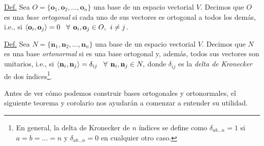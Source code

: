 \documentclass[12pt,dvipsnames]{article}
\begin{document}
\begin{tcolorbox}

    \underline{Def.} Sea $O=\{\mathbf{o}_1, \mathbf{o}_2, ..., \mathbf{o}_n\}$ una base de un espacio vectorial $V$. Decimos que $O$ es una \emph{base ortogonal} si cada uno de sus vectores es ortogonal a todos los demás, i.e., si $\langle\mathbf{o}_i,\mathbf{o}_j\rangle=0\hspace{3mm}\forall\hspace{1.5mm} \mathbf{o}_i, \mathbf{o}_j\in O, \hspace{1.5mm} i\neq j$.

\vspace{3mm}

    \underline{Def.} Sea $N=\{\mathbf{n}_1, \mathbf{n}_2, ..., \mathbf{n}_n\}$ una base de un espacio vectorial $V$. Decimos que $N$ es una base \emph{ortonormal} si es una base ortogonal y, además, todos sus vectores son unitarios, i.e., si $\langle\mathbf{n}_i,\mathbf{n}_j\rangle=\delta_{ij}\hspace{3mm}\forall\hspace{1.5mm} \mathbf{n}_i,\mathbf{n}_j\in N,$ donde $\delta_{ij}$ es la \emph{delta de Kronecker} de dos índices\footnote{En general, la delta de Kronecker de $n$ índices se define como $\delta_{ab...n}=1$ si $a=b=...=n$ y $\delta_{ab...n}=0$ en cualquier otro caso.}.

\end{tcolorbox}

Antes de ver cómo podemos construir bases ortogonales y ortonormales, el siguiente teorema y corolario nos ayudarán a comenzar a entender su utilidad.
\end{document}
